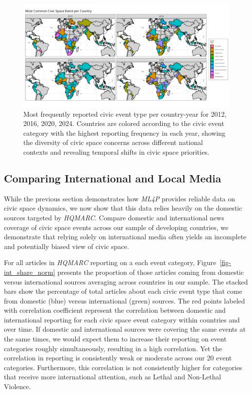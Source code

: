 \documentclass[
  letterpaper,
  DIV=11,
  numbers=noendperiod]{scrartcl}
\begin{document}
\begin{figure}

{\centering \includegraphics{descriptive_maps/figures/dominant_event_paper.png}

}

\caption{\label{fig-map_main_event}Most frequently reported civic event
type per country-year for 2012, 2016, 2020, 2024. Countries are colored
according to the civic event category with the highest reporting
frequency in each year, showing the diversity of civic space concerns
across different national contexts and revealing temporal shifts in
civic space priorities.}

\end{figure}

\hypertarget{comparing-international-and-local-media}{%
\subsection{Comparing International and Local
Media}\label{comparing-international-and-local-media}}

While the previous section demonstrates how \emph{ML4P} provides
reliable data on civic space dynamics, we now show that this data relies
heavily on the domestic sources targeted by \emph{HQMARC}. Compare
domestic and international news coverage of civic space events across
our sample of developing countries, we demonstrate that relying solely
on international media often yields an incomplete and potentially biased
view of civic space.

For all articles in \emph{HQMARC} reporting on a each event category,
Figure~\ref{fig-int_share_norm} presents the proportion of those
articles coming from domestic versus international sources averaging
across countries in our sample. The stacked bars show the percentage of
total articles about each civic event type that come from domestic
(blue) versus international (green) sources. The red points labeled with
correlation coefficient represent the correlation between domestic and
international reporting for each civic space event category within
countries and over time. If domestic and international sources were
covering the same events at the same times, we would expect them to
increase their reporting on event categories roughly simultaneously,
resulting in a high correlation. Yet the correlation in reporting is
consistently weak or moderate across our 20 event categories.
Furthermore, this correlation is not consistently higher for categories
that receive more international attention, such as Lethal and Non-Lethal
Violence.
\end{document}
